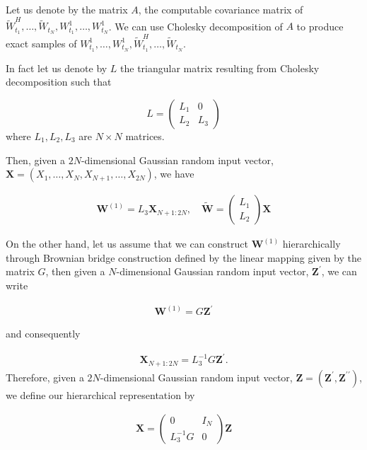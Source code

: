 Let us denote by the matrix $A$, the computable covariance matrix of  $ \widetilde{W}^H_{t_1},\dots, \widetilde{W}_{t_N},W^1_{t_1},\dots, W^1_{t_N}$.  We can use Cholesky decomposition of $A$ to produce exact samples of $W^1_{t_1},\dots, W^1_{t_N}, \widetilde{W}^H_{t_1},\dots, \widetilde{W}_{t_N}$.

In fact let us denote by $L$ the triangular matrix resulting from Cholesky decomposition such that 

\[
L=
\left(
\begin{array}{c|c}
L_1& 0 \\
L_2 & L_3
\end{array}
\right)
\]
where $L_1, L_2,L_3$ are $N \times N$ matrices.

Then, given  a $2 N$-dimensional Gaussian random input vector, $\mathbf{X}=(X_1, \dots,X_N, X_{N+1}, \dots, X_{2N})$, we have

\begin{align}
\mathbf{W}^{(1)}=L_3 \mathbf{X}_{N+1:2N}, \quad \widetilde{\mathbf{W}}= 
\left(
\begin{array}{c}
L_1 \\
L_2 
\end{array}
\right) \mathbf{X}
\end{align}

On the other hand, let us assume that we can construct $\mathbf{W}^{(1)}$ hierarchically  through  Brownian bridge construction defined by the linear mapping given by the matrix $G$, then given a $ N$-dimensional Gaussian random input vector, $\mathbf{Z}^\prime$, we can write

\begin{align*}
\mathbf{W}^{(1)}=G  \mathbf{Z}^\prime
\end{align*}

and consequently

\begin{align*}
 \mathbf{X}_{N+1:2N}= L_3^{-1} G  \mathbf{Z}^\prime.
\end{align*}
Therefore, given a $2 N$-dimensional Gaussian random input vector, $\mathbf{Z}=(\mathbf{Z}^\prime,\mathbf{Z}^{\prime \prime})$, we define our hierarchical representation by

\begin{align}
\mathbf{X}=\left(
\begin{array}{c|c}
0 & I_{N} \\
L_3^{-1} G & 0
\end{array}
\right) \mathbf{Z}
\end{align}

